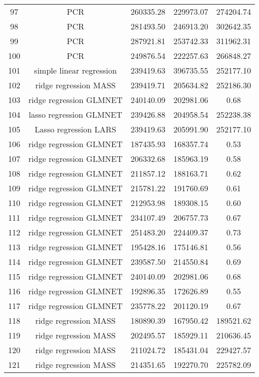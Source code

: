 \begin{tabular}{ccccc}
  97 & PCR & 260335.28 & 229973.07 & 274204.74 \\ 
  98 & PCR & 281493.50 & 246913.20 & 302642.35 \\ 
  99 & PCR & 287921.81 & 253742.33 & 311962.31 \\ 
  100 & PCR & 249876.54 & 222257.63 & 266848.27 \\ 
  101 & simple linear regression & 239419.63 & 396735.55 & 252177.10 \\ 
  102 & ridge regression MASS & 239419.71 & 205634.82 & 252186.30 \\ 
  103 & ridge regression GLMNET & 240140.09 & 202981.06 & 0.68 \\ 
  104 & lasso regression GLMNET & 239426.88 & 204958.54 & 252238.38 \\ 
  105 & Lasso regression LARS & 239419.63 & 205991.90 & 252177.10 \\ 
  106 & ridge regression GLMNET & 187435.93 & 168357.74 & 0.53 \\ 
  107 & ridge regression GLMNET & 206332.68 & 185963.19 & 0.58 \\ 
  108 & ridge regression GLMNET & 211857.12 & 188163.71 & 0.62 \\ 
  109 & ridge regression GLMNET & 215781.22 & 191760.69 & 0.61 \\ 
  110 & ridge regression GLMNET & 212953.98 & 189308.15 & 0.60 \\ 
  111 & ridge regression GLMNET & 234107.49 & 206757.73 & 0.67 \\ 
  112 & ridge regression GLMNET & 251483.20 & 224409.37 & 0.73 \\ 
  113 & ridge regression GLMNET & 195428.16 & 175146.81 & 0.56 \\ 
  114 & ridge regression GLMNET & 239587.50 & 214550.84 & 0.69 \\ 
  115 & ridge regression GLMNET & 240140.09 & 202981.06 & 0.68 \\ 
  116 & ridge regression GLMNET & 192896.35 & 172626.89 & 0.55 \\ 
  117 & ridge regression GLMNET & 235778.22 & 201120.19 & 0.67 \\ 
  118 & ridge regression MASS & 180890.39 & 167950.42 & 189521.62 \\ 
  119 & ridge regression MASS & 202495.57 & 185929.11 & 210636.45 \\ 
  120 & ridge regression MASS & 211024.72 & 185431.04 & 229427.57 \\ 
  121 & ridge regression MASS & 214351.65 & 192270.70 & 225782.09 \\ 

\end{tabular}
